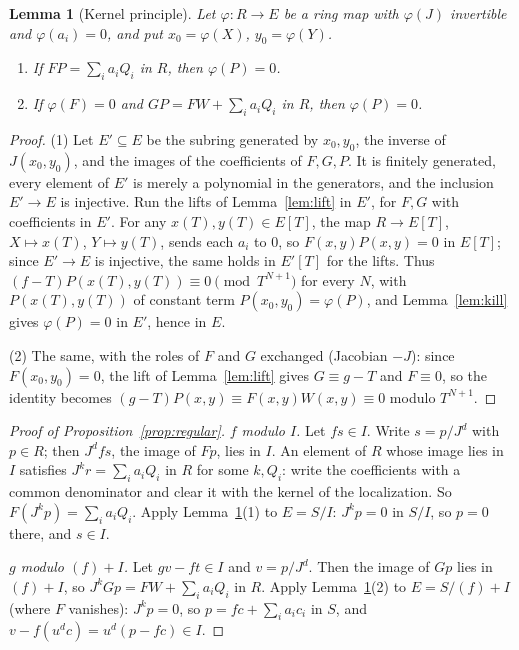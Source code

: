\documentclass[11pt]{amsart}
\newtheorem{lemma}[theorem]{Lemma}
\theoremstyle{definition}
\theoremstyle{remark}
\begin{document}
\begin{lemma}[Kernel principle]\label{lem:kernel}
Let $\varphi:R\to E$ be a ring map with $\varphi(J)$ invertible and
$\varphi(a_i)=0$, and put $x_0=\varphi(X)$, $y_0=\varphi(Y)$.
\begin{enumerate}
\item If $FP=\sum_ia_iQ_i$ in $R$, then $\varphi(P)=0$.
\item If $\varphi(F)=0$ and $GP=FW+\sum_ia_iQ_i$ in $R$, then
 $\varphi(P)=0$.
\end{enumerate}
\end{lemma}

\begin{proof}
(1) Let $E'\subseteq E$ be the subring generated by $x_0,y_0$, the inverse
of $J(x_0,y_0)$, and the images of the coefficients of $F,G,P$. It is
finitely generated, every element of $E'$ is merely a polynomial in the
generators, and the inclusion $E'\to E$ is injective. Run the lifts of
Lemma~\ref{lem:lift} in $E'$, for $F,G$ with coefficients in $E'$. For any
$x(T),y(T)\in E[T]$, the map $R\to E[T]$, $X\mapsto x(T)$, $Y\mapsto y(T)$,
sends each $a_i$ to $0$, so $F(x,y)P(x,y)=0$ in $E[T]$; since $E'\to E$ is
injective, the same holds in $E'[T]$ for the lifts. Thus
$(f-T)P(x(T),y(T))\equiv0\pmod{T^{N+1}}$ for every $N$, with
$P(x(T),y(T))$ of constant term $P(x_0,y_0)=\varphi(P)$, and
Lemma~\ref{lem:kill} gives $\varphi(P)=0$ in $E'$, hence in $E$.

(2) The same, with the roles of $F$ and $G$ exchanged (Jacobian $-J$):
since $F(x_0,y_0)=0$, the lift of Lemma~\ref{lem:lift} gives
$G\equiv g-T$ and $F\equiv0$, so the identity becomes
$(g-T)P(x,y)\equiv F(x,y)W(x,y)\equiv0$ modulo $T^{N+1}$.
\end{proof}

\begin{proof}[Proof of Proposition~\ref{prop:regular}]
\emph{$f$ modulo $I$.} Let $fs\in I$. Write $s=p/J^d$ with $p\in R$; then
$J^dfs$, the image of $Fp$, lies in $I$. An element of $R$ whose image lies
in $I$ satisfies $J^kr=\sum_ia_iQ_i$ in $R$ for some $k,Q_i$: write the
coefficients with a common denominator and clear it with the kernel of
the localization. So $F(J^kp)=\sum_ia_iQ_i$. Apply
Lemma~\ref{lem:kernel}(1) to $E=S/I$: $J^kp=0$ in $S/I$, so $p=0$ there, and
$s\in I$.

\emph{$g$ modulo $(f)+I$.} Let $gv-ft\in I$ and $v=p/J^d$. Then the image of
$Gp$ lies in $(f)+I$, so $J^kGp=FW+\sum_ia_iQ_i$ in $R$. Apply
Lemma~\ref{lem:kernel}(2) to $E=S/(f)+I$ (where $F$ vanishes): $J^kp=0$, so
$p=fc+\sum_ia_ic_i$ in $S$, and $v-f(u^dc)=u^d(p-fc)\in I$.
\end{proof}
\end{document}
